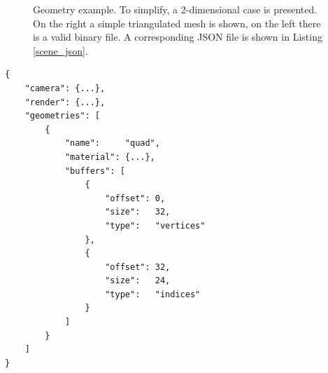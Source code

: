 \begin{figure}

	\caption{Geometry example. To simplify, a 2-dimensional case is presented. On the right a simple triangulated mesh is shown, on the left there is a valid binary file. A corresponding JSON file is shown in Listing \ref{scene_json}.}
	\label{scene_bin}
\end{figure}

\begin{Listing}
	\begin{lstlisting}
{
	"camera": {...},
	"render": {...},
	"geometries": [
		{
			"name":     "quad",
			"material": {...},
			"buffers": [
				{
					"offset": 0,
					"size":   32,
					"type":   "vertices"
				},
				{
				 	"offset": 32,
				 	"size":   24,
				 	"type":   "indices"
				}
			]
		}
	]
}
	\end{lstlisting}
	\caption{JSON scene file example relative to Figure \ref{scene_bin}. Information not relative to the geometry shape has been omitted. Please also remember this is a 2-dimensional example, hence the vertex buffer size is only 2 dimensions * 4 points * 4 bytes = 32 bytes instead of being 48 bytes like it would be in the ordinary 3-dimensional case.}
	\label{scene_json}
\end{Listing}